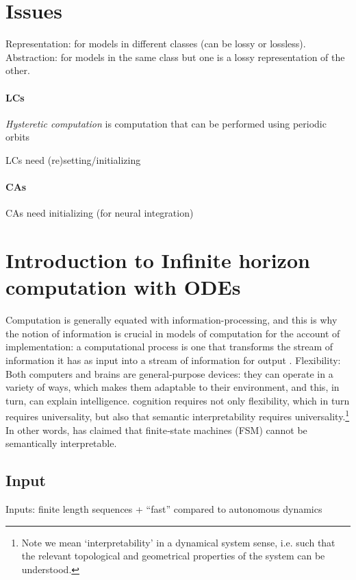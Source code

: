\documentclass{scrartcl}
\theoremstyle{definition}
\theoremstyle{remark}
\begin{document}
\section*{Issues}

Representation: for models in different classes (can be lossy or lossless).
Abstraction: for models in the same class but one is a lossy representation of the other.


\paragraph{LCs}
\emph{Hysteretic computation} is computation that can be performed using periodic orbits

LCs need (re)setting/initializing

\paragraph{CAs}
CAs need initializing (for neural integration)



\newpage
\section{Introduction to Infinite horizon computation with ODEs}	
Computation is generally equated with information-processing, and this is why the notion of information is crucial in models of computation for the account of implementation: a computational process is one that transforms the stream of information it has as input into a stream of information for output \citep{milkowski2014}.
Flexibility: Both computers and brains are general‑purpose devices: they can operate in a variety of ways, which makes them adaptable to their environment, and this, in turn, can explain intelligence. \citep{milkowski2018computermetaphor}
cognition requires not only flexibility, which in turn requires universality, but also that semantic interpretability requires universality.\footnote{Note we mean ‘interpretability’ in a dynamical system sense, i.e. such that the relevant topological and geometrical properties of the system can be understood.}
 In other words, \citep{pylyshyn1984} has claimed that finite‑state machines (FSM) cannot be semantically interpretable.	


\subsection{Input}
Inputs: finite length sequences + ``fast'' compared to autonomous dynamics
\end{document}
